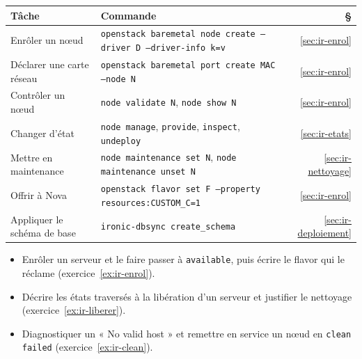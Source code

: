 \begin{center}
\renewcommand{\arraystretch}{1.35}
\begin{tabular}{@{}>{\raggedright\arraybackslash}p{4.0cm}>{\raggedright\arraybackslash}p{10.1cm}r@{}}
\toprule
\textbf{Tâche} & \textbf{Commande} & \textbf{§} \\
\midrule
Enrôler un nœud & \texttt{openstack baremetal node create --driver D --driver-info k=v} & \ref{sec:ir-enrol} \\
Déclarer une carte réseau & \texttt{openstack baremetal port create MAC --node N} & \ref{sec:ir-enrol} \\
Contrôler un nœud & \texttt{node validate N}, \texttt{node show N} & \ref{sec:ir-enrol} \\
Changer d'état & \texttt{node manage}, \texttt{provide}, \texttt{inspect}, \texttt{undeploy} & \ref{sec:ir-etats} \\
Mettre en maintenance & \texttt{node maintenance set N}, \texttt{node maintenance unset N} & \ref{sec:ir-nettoyage} \\
Offrir à Nova & \texttt{openstack flavor set F --property resources:CUSTOM\_C=1} & \ref{sec:ir-enrol} \\
Appliquer le schéma de base & \texttt{ironic-dbsync create\_schema} & \ref{sec:ir-deploiement} \\
\bottomrule
\end{tabular}
\end{center}

\begin{savoirfaire}
\begin{itemize}
  \item Enrôler un serveur et le faire passer à \texttt{available}, puis écrire le flavor qui le réclame (exercice~\ref{ex:ir-enrol}).
  \item Décrire les états traversés à la libération d'un serveur et justifier le nettoyage (exercice~\ref{ex:ir-liberer}).
  \item Diagnostiquer un « No valid host » et remettre en service un nœud en \texttt{clean failed} (exercice~\ref{ex:ir-clean}).
\end{itemize}
\end{savoirfaire}
